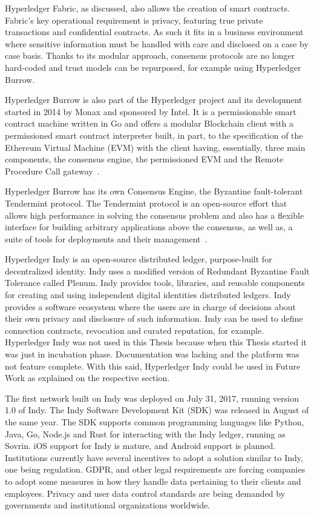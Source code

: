 Hyperledger Fabric, as discussed, also allows the creation of smart contracts.
Fabric's key operational requirement is privacy, featuring true private
transactions and confidential contracts. As such it fits in a business
environment where sensitive information must be handled with care and disclosed
on a case by case basis. Thanks to its modular approach, consensus protocols
are no longer hard-coded and trust models can be repurposed, for example using
Hyperledger Burrow.

Hyperledger Burrow is also part of the Hyperledger project and its development
started in 2014 by Monax and sponsored by Intel. It is a permissionable smart
contract machine written in Go and offers a modular Blockchain client with a
permissioned smart contract interpreter built, in part, to the specification of
the Ethereum Virtual Machine (EVM) with the client having, essentially, three
main components, the consensus engine, the permissioned EVM and the Remote
Procedure Call gateway~\cite{Kuhlman2017,HyperledgerBurrow2017}.

Hyperledger Burrow has its own Consensus Engine, the Byzantine fault-tolerant
Tendermint protocol.  The Tendermint protocol is an open-source effort that
allows high performance in solving the consensus problem and also has a
flexible interface for building arbitrary applications above the consensus, as
well as, a suite of tools for deployments and their
management~\cite{Buchman2016}.

Hyperledger Indy is an open-source distributed ledger, purpose-built for
decentralized identity. Indy uses a modified version of Redundant Byzantine
Fault Tolerance called Plenum. Indy provides tools, libraries, and reusable
components for creating and using independent digital identities distributed
ledgers. Indy provides a software ecosystem where the users are in charge of
decisions about their own privacy and disclosure of such information.  Indy can
be used to define connection contracts, revocation and curated reputation, for
example. Hyperledger Indy was not used in this Thesis because when this Thesis
started it was just in incubation phase. Documentation was lacking and the
platform was not feature complete. With this said, Hyperledger Indy could be
used in Future Work as explained on the respective section.

The first network built on Indy was deployed on July 31, 2017, running version
1.0 of Indy. The Indy Software Development Kit (SDK) was released in August of
the same year. The SDK supports common programming languages like Python, Java,
Go, Node.js and Rust for interacting with the Indy ledger, running as Sovrin.
iOS support for Indy is mature, and Android support is planned. Institutions
currently have several incentives to adopt a solution similar to Indy, one
being regulation. GDPR, and other legal requirements are forcing companies to
adopt some measures in how they handle data pertaining to their clients and
employees. Privacy and user data control standards are being demanded by
governments and institutional organizations worldwide.

